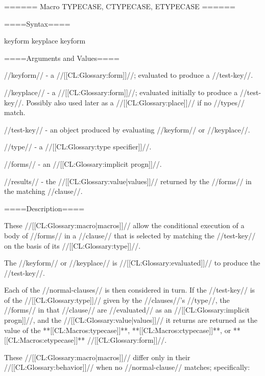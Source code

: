 ====== Macro TYPECASE, CTYPECASE, ETYPECASE ======

====Syntax====

 {keyform  } {}  {keyplace } {}  {keyform } {}

   

====Arguments and Values====

//keyform// - a //[[CL:Glossary:form]]//; evaluated to produce a //test-key//.

//keyplace// - a //[[CL:Glossary:form]]//; evaluated initially to produce a //test-key//. Possibly also used later as a //[[CL:Glossary:place]]// if no //types// match.

//test-key// - an object produced by evaluating //keyform// or //keyplace//.

//type// - a //[[CL:Glossary:type specifier]]//.

//forms// - an //[[CL:Glossary:implicit progn]]//.

//results// - the //[[CL:Glossary:value|values]]// returned by the //forms// in the matching //clause//.

====Description====

These //[[CL:Glossary:macro|macros]]// allow the conditional execution of a body of //forms// in a //clause// that is selected by matching the //test-key// on the basis of its //[[CL:Glossary:type]]//.

The //keyform// or //keyplace// is //[[CL:Glossary:evaluated]]// to produce the //test-key//.

Each of the //normal-clauses// is then considered in turn. If the //test-key// is of the //[[CL:Glossary:type]]// given by the //clauses//'s //type//, the //forms// in that //clause// are //evaluated// as an //[[CL:Glossary:implicit progn]]//, and the //[[CL:Glossary:value|values]]// it returns are returned as the value of the **[[CL:Macros:typecase]]**, **[[CL:Macros:ctypecase]]**, or **[[CL:Macros:etypecase]]** //[[CL:Glossary:form]]//.

These //[[CL:Glossary:macro|macros]]// differ only in their //[[CL:Glossary:behavior]]// when no //normal-clause// matches; specifically:

